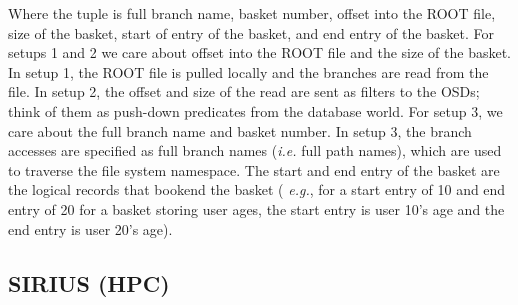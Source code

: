 Where the tuple is full branch name, basket number, offset into the ROOT file,
size of the basket, start of entry of the basket, and end entry of the basket.
For setups 1 and 2 we care about offset into the ROOT file and the size of the
basket.  In setup 1, the ROOT file is pulled locally and the branches are read
from the file. In setup 2, the offset and size of the read are sent as filters
to the OSDs; think of them as push-down predicates from the database world.
For setup 3, we care about the full branch name and basket number.  In setup 3,
the branch accesses are specified as full branch names ({\it i.e.} full path
names), which are used to traverse the file system namespace. The start and end
entry of the basket are the logical records that bookend the basket ({\it
e.g.}, for a start entry of 10 and end entry of 20 for a basket storing user
ages, the start entry is user 10's age and the end entry is user 20's age).  

\subsection{SIRIUS (HPC)}

